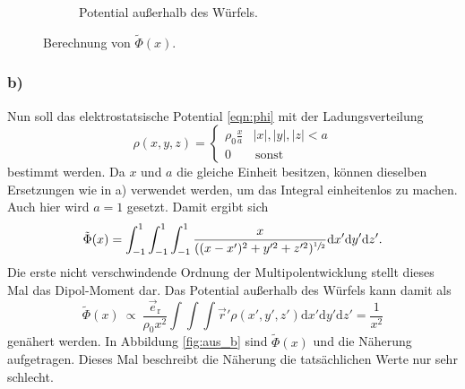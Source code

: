 \begin{figure}
\begin{subfigure}[b]{0.45\textwidth}
      \caption{Potential außerhalb des Würfels.}
      \label{fig:aus_a}
    \end{subfigure}
    \caption{Berechnung von \(\tilde{\Phi}(x)\).}\label{fig:a}
\end{figure}

\subsubsection*{b)}

Nun soll das elektrostatsische Potential \eqref{eqn:phi} mit der Ladungsverteilung
\begin{equation*}
  \rho(x, y, z) = \begin{cases}
  \rho_0 \frac{x}{a} & |x|,|y|,|z| < a \\
  0 &\, \text{sonst}
  \end{cases}
\end{equation*}
bestimmt werden. Da \(x\) und \(a\) die gleiche Einheit besitzen, können dieselben Ersetzungen wie in a) verwendet werden, um das Integral einheitenlos zu machen. Auch hier wird \(a=1\) gesetzt.
Damit ergibt sich
\begin{equation*}
  \tilde{\Phi}(x) = \int_{-1}^1 \int_{-1}^1 \int_{-1}^1 \frac{x}{((x-x')^2+y'^2+z'^2)^{\sfrac{1}{2}}} \mathrm{d}x'\mathrm{d}y'\mathrm{d}z'.
\end{equation*}
Die erste nicht verschwindende Ordnung der Multipolentwicklung stellt dieses Mal das Dipol-Moment dar. Das Potential außerhalb des Würfels kann damit als
\begin{equation*}
  \tilde{\Phi}(x) \: \propto \: \frac{\vec{e}_\text{r}}{\rho_0 x^2} \int \int \int \vec{r}' \rho(x', y', z') \mathrm{d}x'\mathrm{d}y'\mathrm{d}z' = \frac{1}{x^2}
\end{equation*}
genähert werden.
In Abbildung \ref{fig:aus_b} sind \(\tilde{\Phi}(x)\) und die Näherung aufgetragen. Dieses Mal beschreibt die Näherung die tatsächlichen Werte nur sehr schlecht.
